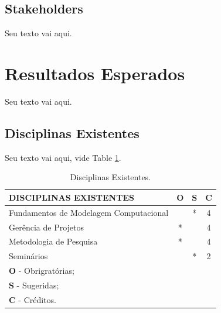 \documentclass[journal]{IEEEtran}									%
\begin{document}

\subsection{Stakeholders}
Seu texto vai aqui.

\section{Resultados Esperados}
Seu texto vai aqui.

\subsection{Disciplinas Existentes}
Seu texto vai aqui, vide Table \ref{t:disciplinas}.

\begin{table}[h]
\centering
\caption{Disciplinas Existentes.}
\begin{tabular}{l|c|c|c}
  \hline
    {\bf DISCIPLINAS EXISTENTES} & {\bf O} & {\bf S} & {\bf C}  \\ \hline
      Fundamentos de Modelagem Computacional        &   & * & 4 \\ \hline
      Gerência de Projetos                          & * &   & 4 \\ \hline
      Metodologia de Pesquisa                       & * &   & 4 \\ \hline
      Seminários                                    &   & * & 2 \\ \hline
      \multicolumn{4}{l}{{\bf O} - Obrigratórias;}		\\
      \multicolumn{4}{l}{{\bf S} - Sugeridas;}			\\
      \multicolumn{4}{l}{{\bf C} - Créditos. }			\\ \cline{1-4}
\end{tabular}
\label{t:disciplinas}
\end{table}
\end{document}
